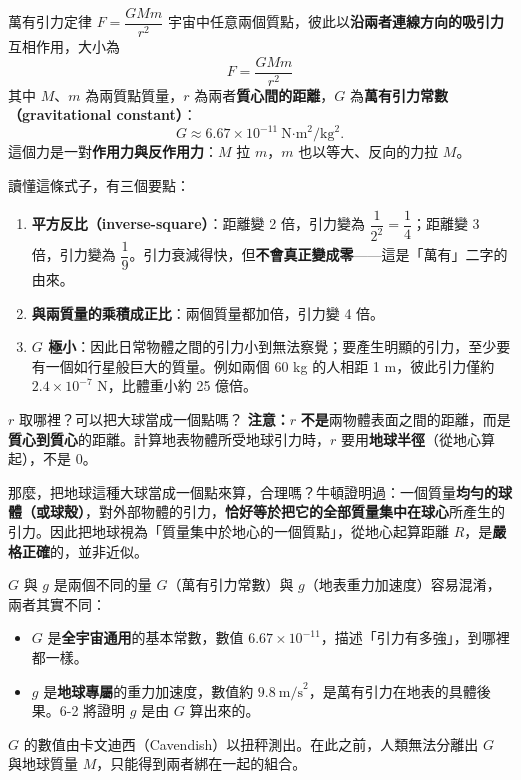 \documentclass[11pt]{article}
\begin{document}
\begin{補充框}{萬有引力定律 $F=\dfrac{GMm}{r^2}$}
宇宙中任意兩個質點，彼此以\textbf{沿兩者連線方向的吸引力}互相作用，大小為
$$\boxed{\;F=\dfrac{GMm}{r^{2}}\;}$$
其中 $M$、$m$ 為兩質點質量，$r$ 為兩者\textbf{質心間的距離}，$G$ 為\textbf{萬有引力常數（gravitational constant）}：
$$G\approx 6.67\times10^{-11}\ \text{N·m}^2/\text{kg}^2.$$
這個力是一對\textbf{作用力與反作用力}：$M$ 拉 $m$，$m$ 也以等大、反向的力拉 $M$。
\end{補充框}


讀懂這條式子，有三個要點：

\begin{enumerate}\setlength{\itemsep}{2pt}
\item \textbf{平方反比（inverse-square）}：距離變 2 倍，引力變為 $\dfrac{1}{2^2}=\dfrac14$；距離變 3 倍，引力變為 $\dfrac19$。引力衰減得快，但\textbf{不會真正變成零}——這是「萬有」二字的由來。
\item \textbf{與兩質量的乘積成正比}：兩個質量都加倍，引力變 4 倍。
\item \textbf{$G$ 極小}：因此日常物體之間的引力小到無法察覺；要產生明顯的引力，至少要有一個如行星般巨大的質量。例如兩個 60 kg 的人相距 1 m，彼此引力僅約 $2.4\times10^{-7}$ N，比體重小約 25 億倍。
\end{enumerate}

\begin{補充框}{$r$ 取哪裡？可以把大球當成一個點嗎？}
\textbf{注意：}$r$ \textbf{不是}兩物體表面之間的距離，而是\textbf{質心到質心}的距離。計算地表物體所受地球引力時，$r$ 要用\textbf{地球半徑}（從地心算起），不是 0。

那麼，把地球這種大球當成一個點來算，合理嗎？牛頓證明過：一個質量\textbf{均勻的球體（或球殼）}，對外部物體的引力，\textbf{恰好等於把它的全部質量集中在球心}所產生的引力。因此把地球視為「質量集中於地心的一個質點」，從地心起算距離 $R$，是\textbf{嚴格正確}的，並非近似。
\end{補充框}

\begin{補充框}{$G$ 與 $g$ 是兩個不同的量}
$G$（萬有引力常數）與 $g$（地表重力加速度）容易混淆，兩者其實不同：
\begin{itemize}\setlength{\itemsep}{1pt}
\item \textbf{$G$} 是\textbf{全宇宙通用}的基本常數，數值 $6.67\times10^{-11}$，描述「引力有多強」，到哪裡都一樣。
\item \textbf{$g$} 是\textbf{地球專屬}的重力加速度，數值約 $9.8\ \text{m/s}^2$，是萬有引力在地表的具體後果。6-2 將證明 $g$ 是由 $G$ 算出來的。
\end{itemize}
$G$ 的數值由卡文迪西（Cavendish）以扭秤測出。在此之前，人類無法分離出 $G$ 與地球質量 $M$，只能得到兩者綁在一起的組合。
\end{補充框}
\end{document}
